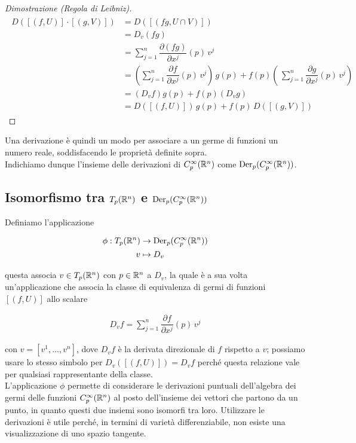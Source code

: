 \begin{proof}[Dimostrazione (Regola di Leibniz)]
	\begin{align}
		\begin{split}
			D ([(f,U)] \cdot [(g,V)]) &= D ([(f g,U \cap V)])\\
			&= D_{v} (f g)\\
			&= \sum_{j=1}^{n} \dfrac{\partial (f g)}{\partial x^{j}} (p) \, v^{j}\\
			&= \left( \sum_{j=1}^{n} \dfrac{\partial f}{\partial x^{j}} (p) \, v^{j} \right) \, g(p) + f(p) \left( \, \sum_{j=1}^{n} \dfrac{\partial g}{\partial x^{j}} (p) \, v^{j} \right)\\
			&= (D_{v} f) g(p) + f(p) (D_{v} g)\\
			&= D ([(f,U)]) \, g(p) + f(p) \, D ([(g,V)])
		\end{split}
	\end{align}
\end{proof}

Una derivazione è quindi un modo per associare a un germe di funzioni un numero reale, soddisfacendo le proprietà definite sopra.\\
Indichiamo dunque l'insieme delle derivazioni di $ C_{p}^{\infty}(\mathbb{R}^{n}) $ come $ \operatorname{Der}_{p}(C_{p}^{\infty}(\mathbb{R}^{n})) $.

\subsection{Isomorfismo tra $ T_{p}(\mathbb{R}^{n}) $ e $ \operatorname{Der}_{p}(C_{p}^{\infty}(\mathbb{R}^{n})) $}

Definiamo l'applicazione

\begin{align}
	\begin{split}
		\phi : T_{p}(\mathbb{R}^{n}) &\to \operatorname{Der}_{p}(C_{p}^{\infty}(\mathbb{R}^{n}))\\
		v &\mapsto D_{v}
	\end{split}
\end{align}

questa associa $ v \in T_{p}(\mathbb{R}^{n}) $ con $ p \in \mathbb{R}^{n} $ a $ D_{v} $, la quale è a sua volta un'applicazione che associa la classe di equivalenza di germi di funzioni $ [(f,U)] $ allo scalare

\begin{align}
	D_{v} f = \sum_{j=1}^{n} \dfrac{\partial f}{\partial x^{j}} (p) \, v^{j}
\end{align}

con $ v = [v^{1},\dots,v^{n}] $, dove $ D_{v} f $ è la derivata direzionale di $ f $ rispetto a $ v $; possiamo usare lo stesso simbolo per $ D_{v} ([(f,U)]) = D_{v} f $ perché questa relazione vale per qualsiasi rappresentante della classe.\\
L'applicazione $ \phi $ permette di considerare le derivazioni puntuali dell'algebra dei germi delle funzioni $ C_{p}^{\infty}(\mathbb{R}^{n}) $ al posto dell'insieme dei vettori che partono da un punto, in quanto questi due insiemi sono isomorfi tra loro. Utilizzare le derivazioni è utile perché, in termini di varietà differenziabile, non esiste una visualizzazione di uno spazio tangente.


